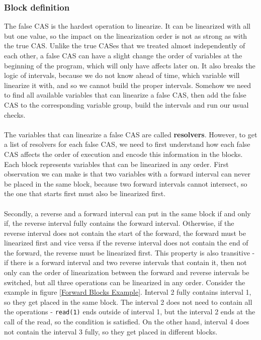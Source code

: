 \documentclass[oneside, a4paper, onecolumn, 10pt]{article}
\begin{document}
\subsubsection{Block definition}
The false CAS is the hardest operation to linearize. It can be linearized with all but one value, so the impact on the linearization order is not as strong as with the true CAS. Unlike the true CASes that we treated almost independently of each other, a false CAS can have a slight change the order of variables at the beginning of the program, which will only have affects later on. It also breaks the logic of intervals, because we do not know ahead of time, which variable will linearize it with, and so we cannot build the proper intervals. Somehow we need to find all available variables that can linearize a false CAS, then add the false CAS to the corresponding variable group, build the intervals and run our usual checks. \\\\
The variables that can linearize a false CAS are called \textbf{resolvers}. However, to get a list of resolvers for each false CAS, we need to first understand how each false CAS affects the order of execution and encode this information in the blocks. Each block represents variables that can be linearized in any order. First observation we can make is that two variables with a forward interval can never be placed in the same block, because two forward intervals cannot intersect, so the one that starts first must also be linearized first.\\\\
Secondly, a reverse and a forward interval can put in the same block if and only if, the reverse interval fully contains the forward interval. Otherwise, if the reverse interval does not contain the start of the forward, the forward must be linearized first and vice versa if the reverse interval does not contain the end of the forward, the reverse must be linearized first. This property is also transitive - if there is a forward interval and two reverse intervals that contain it, then not only can the order of linearization between the forward and reverse intervals be switched, but all three operations can be linearized in any order. Consider the example in figure \ref{Forward Blocks Example}. Interval 2 fully contains interval 1, so they get placed in the same block. The interval 2 does not need to contain all the operations - \texttt{read(1)} ends outside of interval 1, but the interval 2 ends at the call of the read, so the condition is satisfied. On the other hand, interval 4 does not contain the interval 3 fully, so they get placed in different blocks.
\end{document}
